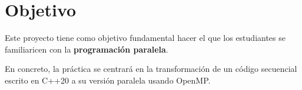 \section{Objetivo}

Este proyecto tiene como objetivo fundamental hacer el que los
estudiantes se familiaricen con la \textbf{programación paralela}.

En concreto, la práctica se centrará en la transformación de un
código secuencial escrito en C++20 a su versión paralela usando OpenMP.
